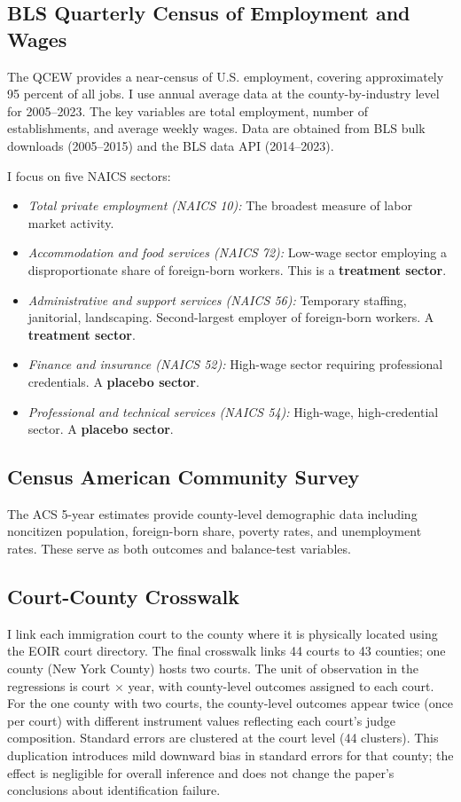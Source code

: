 \documentclass[12pt]{article}
\begin{document}
\subsection{BLS Quarterly Census of Employment and Wages}

The QCEW provides a near-census of U.S. employment, covering approximately 95 percent of all jobs. I use annual average data at the county-by-industry level for 2005--2023. The key variables are total employment, number of establishments, and average weekly wages. Data are obtained from BLS bulk downloads (2005--2015) and the BLS data API (2014--2023).

I focus on five NAICS sectors:
\begin{itemize}
    \item \textit{Total private employment (NAICS 10):} The broadest measure of labor market activity.
    \item \textit{Accommodation and food services (NAICS 72):} Low-wage sector employing a disproportionate share of foreign-born workers. This is a \textbf{treatment sector}.
    \item \textit{Administrative and support services (NAICS 56):} Temporary staffing, janitorial, landscaping. Second-largest employer of foreign-born workers. A \textbf{treatment sector}.
    \item \textit{Finance and insurance (NAICS 52):} High-wage sector requiring professional credentials. A \textbf{placebo sector}.
    \item \textit{Professional and technical services (NAICS 54):} High-wage, high-credential sector. A \textbf{placebo sector}.
\end{itemize}

\subsection{Census American Community Survey}

The ACS 5-year estimates provide county-level demographic data including noncitizen population, foreign-born share, poverty rates, and unemployment rates. These serve as both outcomes and balance-test variables.

\subsection{Court-County Crosswalk}

I link each immigration court to the county where it is physically located using the EOIR court directory. The final crosswalk links 44 courts to 43 counties; one county (New York County) hosts two courts. The unit of observation in the regressions is court $\times$ year, with county-level outcomes assigned to each court. For the one county with two courts, the county-level outcomes appear twice (once per court) with different instrument values reflecting each court's judge composition. Standard errors are clustered at the court level (44 clusters). This duplication introduces mild downward bias in standard errors for that county; the effect is negligible for overall inference and does not change the paper's conclusions about identification failure.
\end{document}

